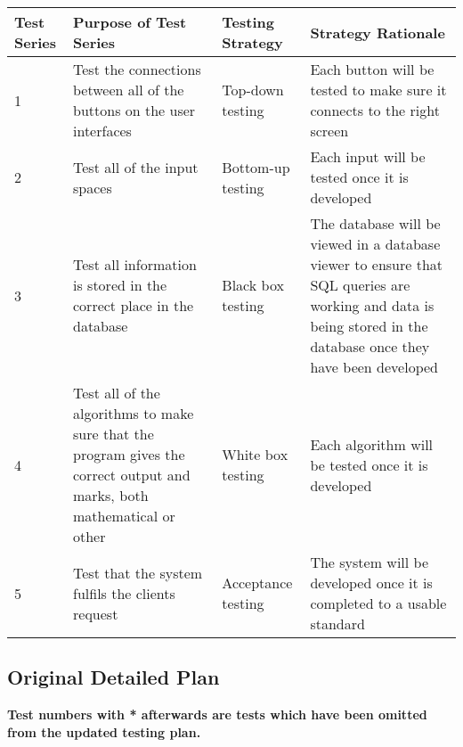 \begin{landscape}
\begin{center}
    \begin{longtable}{|p{2cm}|p{5cm}|p{5cm}|p{4cm}|}
        \hline
        \textbf{Test Series} & \textbf{Purpose of Test Series} & \textbf{Testing Strategy} & \textbf{Strategy Rationale}\\ \hline
        1 & Test the connections between all of the buttons on the user interfaces & Top-down testing & Each button will be tested to make sure it connects to the right screen \\ \hline
        2 & Test all of the input spaces & Bottom-up testing & Each input will be tested once it is developed \\ \hline
        3 & Test all information is stored in the correct place in the database & Black box testing & The database will be viewed in a database viewer to ensure that SQL queries are working and data is being stored in the database once they have been developed \\ \hline
	4 & Test all of the algorithms to make sure that the program gives the correct output and marks, both mathematical or other & White box testing & Each algorithm will be tested once it is developed \\ \hline
	5 & Test that the system fulfils the clients request & Acceptance testing & The system will be developed once it is completed to a usable standard \\ \hline
    \end{longtable}
\end{center}

\subsection{Original Detailed Plan}

\textbf{Test numbers with * afterwards are tests which have been omitted from the updated testing plan.}


\end{landscape}
